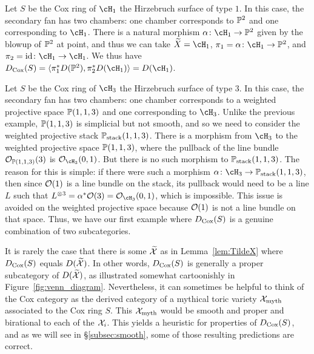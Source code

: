 \documentclass{amsart}
\begin{document}
\begin{example}\label{ex:BlowupAtOnePoint}
    Let $S$ be the Cox ring of $\cH_1$ the Hirzebruch surface of type $1$.  In this case, the secondary fan has two chambers: one chamber corresponds to $\mathbb P^2$ and one corresponding to $\cH_1$. There is a natural morphism $\alpha\colon \cH_1\to \PP^2$ given by the blowup of $\mathbb P^2$ at point, and thus we can take $\widetilde{X} = \cH_1$, $\pi_1 = \alpha \co \cH_1 \to \PP^2$, and $\pi_2 = \id \co \cH_1 \to \cH_1$.  We thus have
    $
    D_{\Cox}(S) = \langle \pi_1^* D(\PP^2), \pi_2^* D(\cH_1)\rangle =
      D(\cH_1)
    $.
\end{example}

\begin{example}\label{ex:Hirzebruch}
    Let $S$ be the Cox ring of $\cH_3$ the Hirzebruch surface of type $3$.  In this case, the secondary fan has two chambers: one chamber corresponds to a weighted projective space $\mathbb P(1,1,3)$ and one corresponding to $\cH_3$.  Unlike the previous example, $\mathbb P(1,1,3)$ is simplicial but not smooth, and so we need to consider the weighted projective stack $\mathbb P_{\operatorname{stack}}(1,1,3)$. There is a morphism from $\cH_3$ to the weighted projective space $\mathbb P(1,1,3)$, where the pullback of the line bundle ${\mathcal O}_{\mathbb P(1,1,3)}(3)$ is $\cO_{\cH_3}(0,1)$.  But there is no such morphism to $\mathbb P_{\operatorname{stack}}(1,1,3)$.  The reason for this is simple:  if there were such a morphism $\alpha\colon \cH_3 \to \PP_{\operatorname{stack}}(1,1,3)$, then since ${\mathcal O}(1)$ is a line bundle on the stack, its pullback would need to be a line $L$ such that $L^{\otimes 3} = \alpha^* \cO(3) = \cO_{\cH_3}(0,1)$, which is impossible. This issue is avoided on the weighted projective space because ${\mathcal O}(1)$ is not a line bundle on that space. Thus, we have our first example where $D_{\operatorname{Cox}}(S)$ is a genuine combination of two subcategories.
\end{example}



\begin{remark}\label{rmk:mythical}
    It is rarely the case that there is some $\widetilde{\mathcal X}$ as in Lemma~\ref{lem:TildeX} where $D_{\operatorname{Cox}}(S)$ equals $D(\widetilde{\mathcal X})$.  In other words, $D_{\operatorname{Cox}}(S)$ is generally a proper subcategory of $D(\widetilde{\mathcal X})$, as illustrated somewhat cartoonishly in Figure~\ref{fig:venn_diagram}. Nevertheless, it can sometimes be helpful to think of the Cox category as the derived category of a mythical toric variety $\mathcal X_{\text{myth}}$ associated to the Cox ring $S$.  This $\mathcal X_{\text{myth}}$ would be smooth and proper and birational to each of the $\mathcal X_i$. This yields a heuristic for properties of $D_{\operatorname{Cox}}(S)$, and as we will see in \S\ref{subsec:smooth}, some of those resulting predictions are correct.
\end{remark}
\end{document}
